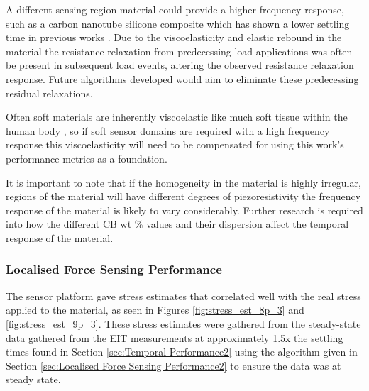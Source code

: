 
A different sensing region material could provide a higher frequency response, such as a carbon nanotube silicone composite which has shown a lower settling time in previous works \citep{Zhao2013,Vidhate2010}. Due to the viscoelasticity and elastic rebound in the material the resistance relaxation from predecessing load applications was often be present in subsequent load events, altering the observed resistance relaxation response. Future algorithms developed would aim to eliminate these predecessing residual relaxations. 

Often soft materials are inherently viscoelastic like much soft tissue within the human body \citep{Landry2021}, so if soft sensor domains are required with a high frequency response this viscoelasticity will need to be compensated for using this work's performance metrics as a foundation.  

It is important to note that if the homogeneity in the material is highly irregular, regions of the material will have different degrees of piezoresistivity the frequency response of the material is likely to vary considerably. Further research is required into how the different CB wt \% values and their dispersion affect the temporal response of the material.


\subsubsection{Localised Force Sensing Performance}\label{sec:Localised Force Sensing Performance3}
The sensor platform gave stress estimates that correlated well with the real stress applied to the material, as seen in Figures \ref{fig:stress_est_8p_3} and \ref{fig:stress_est_9p_3}. These stress estimates were gathered from the steady-state data gathered from the EIT measurements at approximately 1.5x the settling times found in Section \ref{sec:Temporal Performance2} using the algorithm given in Section \ref{sec:Localised Force Sensing Performance2} to ensure the data was at steady state.

